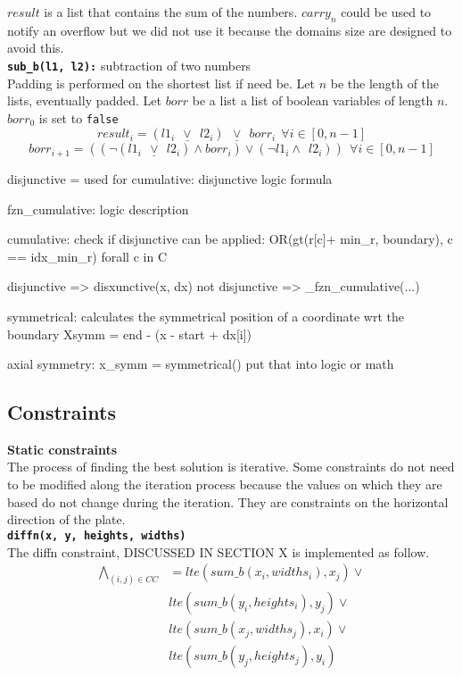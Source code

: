 $result$ is a list that contains the sum of the numbers. $carry_n$ could be used to
notify an overflow but we did  not use it because the domains size are designed to avoid this.\\

\texttt{\textbf{sub\_b(l1, l2):}} subtraction of two numbers\\
Padding is performed on the shortest list if need be.
Let $n$ be the length of the lists, eventually padded.
Let $borr$ be a list a list of boolean variables of length $n$. $borr_0$ is set to \texttt{false} 
\begin{equation}
    result_i = (l1_i \ \ \underline\vee \ \ l2_i) \ \ \underline\vee \ \ borr_i \  \ \forall i \in [0, n-1]
\end{equation}
\begin{equation}
    borr_{i+1} = ((\neg (l1_i \ \ \underline\vee \ \ l2_i) \wedge borr_i) \vee (\neg l1_i \wedge \ \ l2_i)) \  \ 
    \forall i \in [0, n-1]
\end{equation}

disjunctive = used for cumulative:
disjunctive logic formula


fzn\_cumulative:
logic description

cumulative:
check if disjunctive can be applied:
OR(gt(r[c]+ min\_r, boundary), c == idx\_min\_r) forall c in C

disjunctive => disxunctive(x, dx)
not disjunctive => \_fzn\_cumulative(...)

symmetrical: calculates the symmetrical position of a coordinate wrt the boundary
Xsymm = end - (x - start + dx[i])

axial symmetry:
x\_symm = symmetrical()
put that into logic or math





\subsection{Constraints}

\textbf{Static constraints}\\
The process of finding the best solution is iterative. Some constraints do not 
need to be modified along the iteration process because the values on which they 
are based do not change during the iteration. They are constraints on the horizontal 
direction of the plate.\\

\texttt\textbf{diffn(x, y, heights, widths)}\\
The diffn constraint, DISCUSSED IN SECTION X is implemented as follow.
\begin{equation}
    \begin{split}
        \bigwedge\limits_{(i, j) \in CC}&=
        lte(sum\_b(x_i, widths_i), x_j) \vee \\
        &lte(sum\_b(y_i, heights_i), y_j) \vee \\
        &lte(sum\_b(x_j, widths_j), x_i) \vee \\
        &lte(sum\_b(y_j, heights_j), y_i)
    \end{split}
\end{equation}\\

